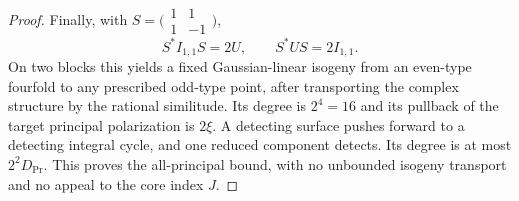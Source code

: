 \begin{proof}
Finally, with $S=\bigl(\begin{smallmatrix}1&1\\1&-1\end{smallmatrix}\bigr)$,
\[
 S^*I_{1,1}S=2U,\qquad S^*US=2I_{1,1}.
\]
On two blocks this yields a fixed Gaussian-linear isogeny from an
even-type fourfold to any prescribed odd-type point, after transporting
the complex structure by the rational similitude. Its degree is
$2^4=16$ and its pullback of the target principal polarization is
$2\xi$. A detecting surface pushes forward to a detecting integral
cycle, and one reduced component detects. Its degree is at most
$2^2D_{\mathrm{Pr}}$. This proves the all-principal bound, with no
unbounded isogeny transport and no appeal to the core index $J$.
\end{proof}

